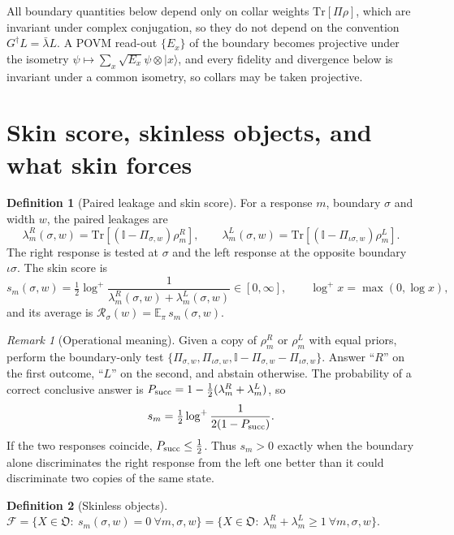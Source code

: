 \documentclass[11pt]{article}
\theoremstyle{definition}
\newtheorem{definition}{Definition}
\theoremstyle{remark}
\newtheorem{remark}{Remark}
\newcommand{\Tr}{\mathrm{Tr}}
\newcommand{\E}{\mathbb{E}}
\newcommand{\one}{\mathbb{I}}
\newcommand{\ket}[1]{|#1\rangle}
\newcommand{\Obj}{\mathfrak{O}}
\newcommand{\Free}{\mathcal{F}}
\newcommand{\isig}{\iota\sigma}
\begin{document}
All boundary quantities below depend only on collar weights $\Tr[\Pi\rho]$, which are invariant under complex conjugation, so they do not depend on the convention $G^\dagger L=\bar\lambda L$. A POVM read-out $\{E_x\}$ of the boundary becomes projective under the isometry $\psi\mapsto\sum_x\sqrt{E_x}\psi\otimes\ket x$, and every fidelity and divergence below is invariant under a common isometry, so collars may be taken projective.

\section{Skin score, skinless objects, and what skin forces}
\label{sec:score}

\begin{definition}[Paired leakage and skin score]\label{def:score}
For a response $m$, boundary $\sigma$ and width $w$, the paired leakages are
\[
\lambda^R_m(\sigma,w)=\Tr[(\one-\Pi_{\sigma,w})\rho^R_m],\qquad
\lambda^L_m(\sigma,w)=\Tr[(\one-\Pi_{\isig,w})\rho^L_m].
\]
The right response is tested at $\sigma$ and the left response at the opposite boundary $\isig$. The skin score is
\[
s_m(\sigma,w)=\tfrac12\log^+\frac{1}{\lambda^R_m(\sigma,w)+\lambda^L_m(\sigma,w)}\in[0,\infty],\qquad \log^+x=\max(0,\log x),
\]
and its average is $\mathcal R_\sigma(w)=\E_\pi\, s_m(\sigma,w)$.
\end{definition}

\begin{remark}[Operational meaning]\label{rem:operational}
Given a copy of $\rho^R_m$ or $\rho^L_m$ with equal priors, perform the boundary-only test $\{\Pi_{\sigma,w},\Pi_{\isig,w},\one-\Pi_{\sigma,w}-\Pi_{\isig,w}\}$. Answer ``$R$'' on the first outcome, ``$L$'' on the second, and abstain otherwise. The probability of a correct conclusive answer is $P_{\rm succ}=1-\frac12(\lambda^R_m+\lambda^L_m)$, so
\[
s_m=\tfrac12\log^+\frac{1}{2(1-P_{\rm succ})}.
\]
If the two responses coincide, $P_{\rm succ}\le\frac12$. Thus $s_m>0$ exactly when the boundary alone discriminates the right response from the left one better than it could discriminate two copies of the same state.
\end{remark}

\begin{definition}[Skinless objects]\label{def:free}
$\Free=\{X\in\Obj:\ s_m(\sigma,w)=0\ \forall m,\sigma,w\}=\{X\in\Obj:\ \lambda^R_m+\lambda^L_m\ge1\ \forall m,\sigma,w\}$.
\end{definition}
\end{document}
